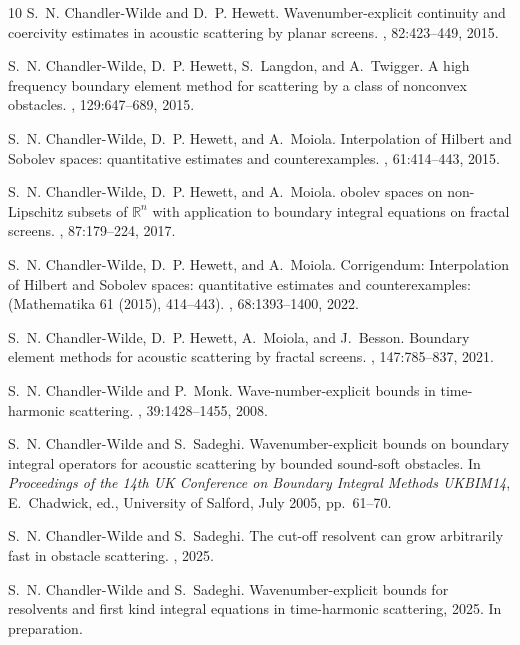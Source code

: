 \documentclass{birkjour}
\theoremstyle{definition}
\theoremstyle{remark}
\numberwithin{equation}{section}
\begin{document}
\begin{thebibliography}{10}
S.~N. Chandler-Wilde and D.~P. Hewett.
\newblock Wavenumber-explicit continuity and coercivity estimates in acoustic
  scattering by planar screens.
, 82:423--449, 2015.

S.~N. Chandler-Wilde, D.~P. Hewett, S.~Langdon, and A.~Twigger.
\newblock A high frequency boundary element method for scattering by a class of
  nonconvex obstacles.
, 129:647--689, 2015.

S.~N. Chandler-Wilde, D.~P. Hewett, and A.~Moiola.
\newblock Interpolation of {H}ilbert and {S}obolev spaces: quantitative
  estimates and counterexamples.
, 61:414--443, 2015.

S.~N. Chandler-Wilde, D.~P. Hewett, and A.~Moiola.
obolev spaces on non-{L}ipschitz subsets of $\mathbb{R}^n$ with
  application to boundary integral equations on fractal screens.
, 87:179--224, 2017.

S.~N. Chandler-Wilde, D.~P. Hewett, and A.~Moiola.
\newblock Corrigendum: Interpolation of {H}ilbert and {S}obolev spaces:
  quantitative estimates and counterexamples: ({M}athematika 61 (2015),
  414--443).
, 68:1393--1400, 2022.

S.~N. Chandler-Wilde, D.~P. Hewett, A.~Moiola, and J.~Besson.
\newblock Boundary element methods for acoustic scattering by fractal screens.
, 147:785--837, 2021.

S.~N. Chandler-Wilde and P.~Monk.
\newblock Wave-number-explicit bounds in time-harmonic scattering.
, 39:1428--1455, 2008.


S.~N. Chandler-Wilde and S.~Sadeghi.
\newblock Wavenumber-explicit bounds on boundary integral operators for acoustic scattering by bounded sound-soft obstacles.
\newblock In {\em Proceedings of the 14th UK Conference on Boundary Integral
Methods UKBIM14}, E.~Chadwick, ed., University of Salford, July 2005, pp.~61--70.

S.~N. Chandler-Wilde and S.~Sadeghi.
\newblock The cut-off resolvent can grow arbitrarily fast in obstacle
  scattering.
, 2025.

S.~N. Chandler-Wilde and S.~Sadeghi.
\newblock Wavenumber-explicit bounds for resolvents and first kind integral
  equations in time-harmonic scattering, 2025.
\newblock In preparation.


\end{thebibliography}
\end{document}
